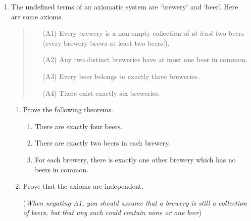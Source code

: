 \begin{exercises}{}{}
\begin{enumerate}
		
		\item The undefined terms of an axiomatic system are `brewery' and `beer'. Here are some axioms.
	  \begin{quote}
		\begin{itemize}
	  	\item[(A1)] Every brewery is a non-empty collection of \emph{at least} two beers (every brewery brews at least two beers!).
	  	\item[(A2)] Any two distinct breweries have at most one beer in common.
	  	\item[(A3)] Every beer belongs to exactly three breweries.
	  	\item[(A4)] There exist exactly six breweries.
		\end{itemize}
	  \end{quote}
	  \begin{enumerate}
	    \item Prove the following theorems.
	    \begin{enumerate}
	      \item There are exactly four beers.
	      \item There are exactly two beers in each brewery.
	      \item For each brewery, there is exactly one other brewery which has no beers in common.
	  	\end{enumerate}
	  	\item Prove that the axioms are independent.\par
	  	(\emph{When negating A1, you should assume that a brewery is still a collection of beers, but that any such could contain none or one beer})
	  \end{enumerate}
	  
	\end{enumerate}
\end{exercises}